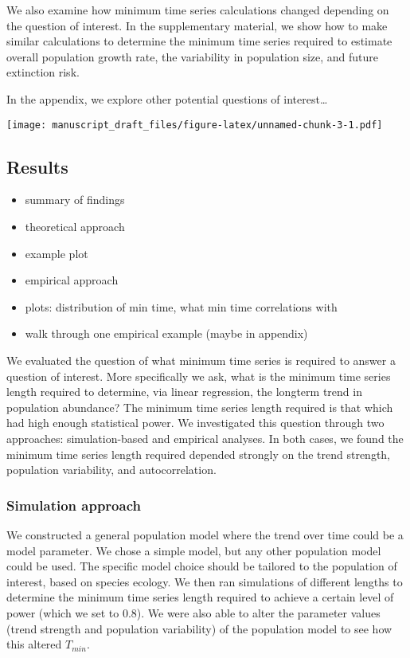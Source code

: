 \documentclass[11pt,]{article}
\providecommand{\tightlist}{%
  \setlength{\itemsep}{0pt}\setlength{\parskip}{0pt}}
\begin{document}
We also examine how minimum time series calculations changed depending
on the question of interest. In the supplementary material, we show how
to make similar calculations to determine the minimum time series
required to estimate overall population growth rate, the variability in
population size, and future extinction risk.

In the appendix, we explore other potential questions of
interest\ldots{}

\texttt{[image: manuscript\_draft\_files/figure-latex/unnamed-chunk-3-1.pdf]}

\subsection{Results}\label{results}

\begin{itemize}
\tightlist
\item
  summary of findings
\item
  theoretical approach
\item
  example plot
\item
  empirical approach
\item
  plots: distribution of min time, what min time correlations with
\item
  walk through one empirical example (maybe in appendix)
\end{itemize}

We evaluated the question of what minimum time series is required to
answer a question of interest. More specifically we ask, what is the
minimum time series length required to determine, via linear regression,
the longterm trend in population abundance? The minimum time series
length required is that which had high enough statistical power. We
investigated this question through two approaches: simulation-based and
empirical analyses. In both cases, we found the minimum time series
length required depended strongly on the trend strength, population
variability, and autocorrelation.

\subsubsection{Simulation approach}\label{simulation-approach}

We constructed a general population model where the trend over time
could be a model parameter. We chose a simple model, but any other
population model could be used. The specific model choice should be
tailored to the population of interest, based on species ecology. We
then ran simulations of different lengths to determine the minimum time
series length required to achieve a certain level of power (which we set
to 0.8). We were also able to alter the parameter values (trend strength
and population variability) of the population model to see how this
altered \(T_{min}\).
\end{document}
